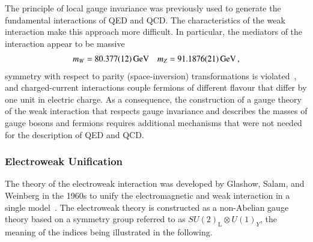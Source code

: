 The principle of local gauge invariance was previously used to generate the
fundamental interactions of QED and QCD. The characteristics of the weak
interaction make this approach more difficult. In particular, the mediators of
the interaction appear to be massive~\cite{pdg2020}
\begin{align*}
  m_W = \SI{80.377 +- 0.012}{\ensuremath{\text{GeV}}} && m_{Z} = \SI{91.1876 +- 0.0021}{\ensuremath{\text{GeV}}} \,\text{,}
\end{align*}
symmetry with respect to parity (space-inversion) transformations is
violated~\cite{Wu:1957my}, and charged-current interactions couple fermions of
different flavour that differ by one unit in electric charge. As a consequence,
the construction of a gauge theory of the weak interaction that respects gauge
invariance and describes the masses of gauge bosons and fermions requires
additional mechanisms that were not needed for the description of QED and QCD.


\subsubsection{Electroweak Unification}

The theory of the electroweak interaction was developed by Glashow, Salam, and
Weinberg in the 1960s to unify the electromagnetic and weak interaction in a
single model~\cite{Glashow:1961tr,Salam:1964ry,Weinberg:1967tq}. The electroweak
theory is constructed as a non-Abelian gauge theory based on a symmetry group
referred to as $SU(2)_{\text{L}} \otimes U(1)_{Y}$, the meaning of the indices
being illustrated in the following.

